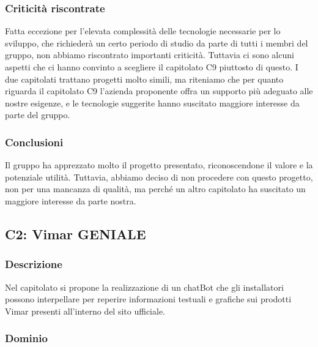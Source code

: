 \subsubsection{Criticità riscontrate}
Fatta eccezione per l’elevata complessità delle tecnologie necessarie per lo sviluppo, 
che richiederà un certo periodo di studio da parte di tutti i membri del gruppo, 
non abbiamo riscontrato importanti criticità. 
Tuttavia ci sono alcuni aspetti che ci hanno convinto a scegliere il capitolato C9 piuttosto di questo. 
I due capitolati trattano progetti molto simili, ma riteniamo che per quanto riguarda il capitolato C9 
l’azienda proponente offra un supporto più adeguato alle nostre esigenze, 
e le tecnologie suggerite hanno suscitato maggiore interesse da parte del gruppo.
\subsubsection{Conclusioni}
Il gruppo ha apprezzato molto il progetto presentato, 
riconoscendone il valore e la potenziale utilità. 
Tuttavia, abbiamo deciso di non procedere con questo progetto, 
non per una mancanza di qualità, ma perché un altro capitolato ha suscitato un maggiore interesse da parte nostra.

\subsection{C2: Vimar GENIALE}

\subsubsection{Descrizione}
Nel capitolato si propone la realizzazione di un chatBot che gli installatori 
possono interpellare per reperire  informazioni testuali e grafiche sui prodotti 
Vimar presenti all’interno del sito ufficiale.
\subsubsection{Dominio}
